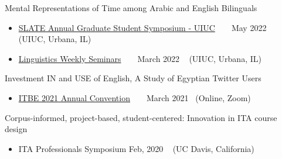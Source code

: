 \begin{talks}
	
		\talk
	{Mental Representations of Time among Arabic and English Bilinguals}
	{
	\begin{itemize}[leftmargin=.4in]
	\item 	     \href{https://slate.illinois.edu/news-events/annual-graduate-student-symposium}{SLATE Annual Graduate Student Symposium - UIUC} ~  \lbrack\href{https://slate.illinois.edu/news-events/annual-graduate-student-symposium}{\small{\websiteSymbol}}\rbrack ~ \hfill May 2022 ~ (UIUC, Urbana, IL)
	    \item 	     \href{https://linguistics.illinois.edu/research/department-seminars}{Linguistics Weekly Seminars} ~  \lbrack\href{https://linguistics.illinois.edu/research/department-seminars}{\small{\websiteSymbol}}\rbrack ~
	    \hfill March 2022 ~ (UIUC, Urbana, IL)
	    
	   
	\end{itemize}
	}
   
    
	
	\talk
	{Investment IN and USE of English, A Study of Egyptian Twitter Users}
	{
	\begin{itemize}[leftmargin=.4in]
	    \item \href{https://www.itbe.org/}{ITBE 2021 Annual Convention} ~  \lbrack\href{https://www.itbe.org/}{\small{\websiteSymbol}}\rbrack ~ 
	    \hfill March 2021~ (Online, Zoom)
	\end{itemize}
	}
 \talk
	{Corpus-informed, project-based, student-centered: Innovation in ITA course design}
	{
	\begin{itemize}[leftmargin=.4in]
	    \item {ITA Professionals Symposium} 
	        \hfill Feb, 2020 ~ (UC Davis, California)
	    
	\end{itemize}
	}
	

\end{talks}    
\vspace{-3mm}

